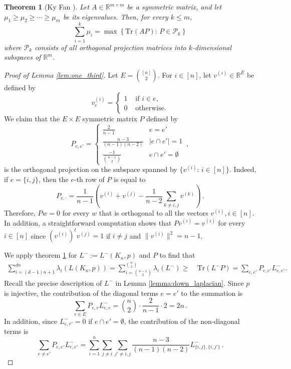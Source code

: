 \documentclass[a4paper,11pt]{article}
\theoremstyle{plain}
\newtheorem{theorem}{\bf Theorem}[section]
\theoremstyle{definition}
\newcommand{\Rea}{{\mathbb R}}
\begin{document}
\begin{theorem}[Ky Fan {\cite[Thm. 1]{fan1949theorem}}]\label{thm:fan}
Let $A\in\Rea^{m\times m} $ be a symmetric matrix, and let $\mu_1\geq \mu_2\geq \cdots\geq \mu_m$ be its eigenvalues. Then, for every $k\leq m$,
\[
\sum_{i=1}^k \mu_i = \max\left\{ \text{Tr}(AP):\, P\in\mathcal{P}_k\right\}
\]
where $\mathcal{P}_k$ consists of all orthogonal projection matrices into $k$-dimensional subspaces of $\Rea^m$.
\end{theorem}
\begin{proof}[Proof of Lemma \ref{lem:one_third}]
Let $E=\binom{[n]}{2}$. For $i\in[n]$, let  $v^{(i)}\in \Rea^E$ be defined by
\[
v^{(i)}_e=\begin{cases}
    1 & \text{ if } i\in e,\\
    0 & \text{ otherwise.}
\end{cases}
\]
We claim that the 
$E\times E$ symmetric matrix $P$ defined by
\[
P_{e,e'} =\left\{\begin{matrix}
\frac{2}{n-1}&e=e'\\[6pt]
\frac{n-3}{(n-1)(n-2)}&|e\cap e'|=1\\[6pt]
\frac{-1}{\binom {n-1}2}&e\cap e'=\emptyset
\end{matrix}\right.\,,
\]
is the orthogonal projection on the subspace spanned by $\{v^{(i)} :\, i\in[n]\}$. Indeed, if $e=\{i,j\}$, then the $e$-th row of $P$ is equal to 
\[
P_{e,\cdot} = \frac{1}{n-1}\left(v^{(i)}+v^{(j)}-\frac{1}{n-2}\sum_{k\ne i,j}v^{(k)}\right)\,.
\]
Therefore, $Pw=0$ for every $w$ that is orthogonal to all the vectors $v^{(i)},i\in[n]$. In addition, a straightforward computation shows that $Pv^{(i)}=v^{(i)}$ for every $i\in[n]$ since  $(v^{(i)})^tv^{(j)}=1$ if $i\ne j$ and $\|v^{(i)}\|^2=n-1$.

We apply theorem \ref{thm:fan} for $L^-:=L^-(K_n,p)$
and $P$ to find that
\begin{align*}
\sum_{i=(d-1)n+1}^{dn}\lambda_{i}(L(K_n,p))=
\sum_{i=\binom{n-1}{2}}^{\binom{n}{2}}\lambda_i(L^-) \ge&~ \mathrm{Tr}( L^-P)=\sum_{e,e'}P_{e,e'}L^-_{e,e'}.
\end{align*}
Recall the precise description of $L^-$ in Lemma \ref{lemma:down_laplacian}. Since $p$ is injective, the contribution of the diagonal terms $e=e'$ to the summation is
\begin{equation}
\sum_{e\in E}P_{e,e}L^-_{e,e} = \binom{n}2\cdot \frac{2}{n-1}\cdot 2=2n\,.
\label{eq:diagonal}    
\end{equation}
In addition, since $L^-_{e,e'}=0$ if $e\cap e'=\emptyset$, the contribution of the non-diagonal terms is
\begin{equation}\label{eq:ee'}
\sum_{e\ne e'}P_{e,e'}L^-_{e,e'}=\sum_{i=1}^{n}\sum_{j\ne i}\sum_{j'\ne i,j} \frac{n-3}{(n-1)(n-2)}L^-_{\{i,j\},\{i,j'\}}\,.    
\end{equation}


\end{proof}
\end{document}
